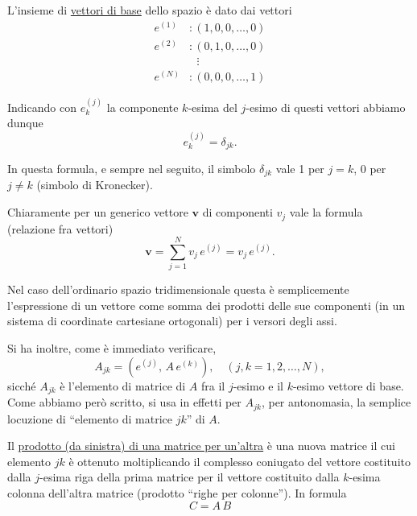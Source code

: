 \documentclass[11pt, a4paper]{book}
\numberwithin{equation}{section}
\begin{document}
L'insieme di \underline{vettori di base} dello spazio è dato dai vettori
\begin{align*}
    e^{(1)} &: (1, 0, 0, \ldots, 0) \\
    e^{(2)} &: (0, 1, 0, \ldots, 0) \\
    &\phantom{:}\ \vdots \\
    e^{(N)} &: (0, 0, 0, \ldots, 1)
\end{align*}
\begin{equation}
    \tag{8a}
\end{equation}

Indicando con $e^{(j)}_k$ la componente $k$-esima del $j$-esimo di questi vettori abbiamo dunque
\begin{equation}
    e^{(j)}_k = \delta_{jk}.
    \tag{8b}
\end{equation}

In questa formula, e sempre nel seguito, il simbolo $\delta_{jk}$ vale 1 per $j=k$, 0 per $j \neq k$ (simbolo di Kronecker).

Chiaramente per un generico vettore $\mathbf{v}$ di componenti $v_j$ vale la formula (relazione fra vettori)
\begin{equation}
    \mathbf{v} = \sum_{j=1}^{N} v_j\, e^{(j)} = v_j\, e^{(j)}.
    \tag{9}
\end{equation}

Nel caso dell'ordinario spazio tridimensionale questa è semplicemente l'espressione di un vettore come somma dei prodotti delle sue componenti (in un sistema di coordinate cartesiane ortogonali) per i versori degli assi.

Si ha inoltre, come è immediato verificare,
\begin{equation}
    A_{jk} = \left( e^{(j)},\, A\, e^{(k)} \right), \quad (j,k = 1,2,\ldots,N),
    \tag{10}
\end{equation}
sicché $A_{jk}$ è l'elemento di matrice di $A$ fra il $j$-esimo e il $k$-esimo vettore di base. Come abbiamo però scritto, si usa in effetti per $A_{jk}$, per antonomasia, la semplice locuzione di ``elemento di matrice $jk$'' di $A$.

Il \underline{prodotto (da sinistra) di una matrice per un'altra} è una nuova matrice il cui elemento $jk$ è ottenuto moltiplicando il complesso coniugato del vettore costituito dalla $j$-esima riga della prima matrice per il vettore costituito dalla $k$-esima colonna dell'altra matrice (prodotto ``righe per colonne''). In formula
\begin{equation}
    C = A\,B
    \tag{11a}
\end{equation}
\end{document}

